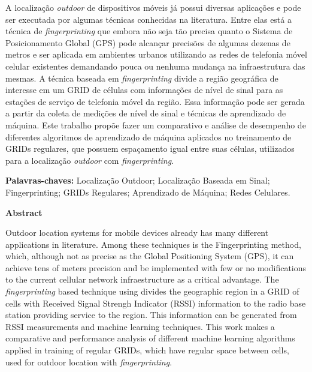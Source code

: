 \documentclass[12pt]{article}
\begin{document}
    \par{
    A localização \textit{outdoor} de dispositivos móveis já possui diversas aplicações e pode ser executada por algumas técnicas conhecidas na literatura. Entre elas está a técnica de \textit{fingerprinting} que embora não seja tão precisa quanto o Sistema de Posicionamento Global (GPS) pode alcançar precisões de algumas dezenas de metros e ser aplicada em ambientes urbanos utilizando as redes de telefonia móvel celular existentes demandando pouca ou nenhuma mudança na infraestrutura das mesmas. A técnica baseada em \textit{fingerprinting} divide a região geográfica de interesse em um GRID de células com informações de nível de sinal para as estações de serviço de telefonia móvel da região. Essa informação pode ser gerada a partir da coleta de medições de nível de sinal e técnicas de aprendizado de máquina. Este trabalho propõe fazer um comparativo e análise de desempenho de diferentes algoritmos de aprendizado de máquina aplicados no treinamento de GRIDs regulares, que possuem espaçamento igual entre suas células, utilizados para a localização \textit{outdoor} com \textit{fingerprinting}.  
    }
    
    \vspace{10pt}
    
    \par{\textbf{Palavras-chaves:} Localização Outdoor; Localização Baseada em Sinal; Fingerprinting; GRIDs Regulares; Aprendizado de Máquina; Redes Celulares.}

    \newpage
    \thispagestyle{empty}
    \begin{center}
    \textbf{\LARGE Abstract}
    \end{center}
    
    \par{
    Outdoor location systems for mobile devices already has many different applications in literature. Among these techniques is the Fingerprinting method, which, although not as precise as the Global Positioning System (GPS), it can achieve tens of meters precision and be implemented with few or no modifications to the current cellular network infraestructure as a critical advantage. The \textit{fingerprinting} based technique using divides the geographic region in a GRID of cells with Received Signal Strengh Indicator (RSSI) information to the radio base station providing service to the region. This information can be generated from RSSI measurements and machine learning techniques. This work makes a comparative and performance analysis of different machine learning algorithms applied in training of regular GRIDs, which have regular space between cells, used for outdoor location with \textit{fingerprinting}. 
    }
    
\end{document}
